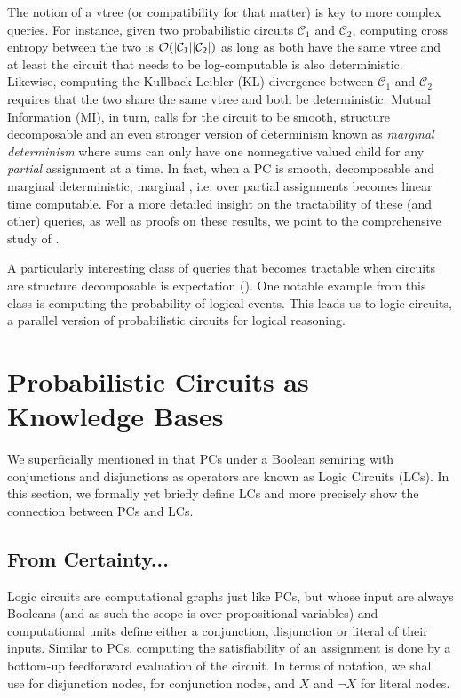 The notion of a vtree (or compatibility for that matter) is key to more complex queries. For
instance, given two probabilistic circuits $\mathcal{C}_1$ and $\mathcal{C}_2$, computing cross
entropy between the two is $\mathcal{O}(|\mathcal{C}_1||\mathcal{C}_2|)$ as long as both have the same
vtree and at least the circuit that needs to be log-computable is also deterministic. Likewise,
computing the Kullback-Leibler (KL) divergence between $\mathcal{C}_1$ and $\mathcal{C}_2$ requires
that the two share the same vtree and both be deterministic. Mutual Information (MI), in turn,
calls for the circuit to be smooth, structure decomposable and an even stronger version of
determinism known as \emph{marginal determinism} where sums can only have one nonnegative valued
child for any \emph{partial} assignment at a time. In fact, when a PC is smooth, decomposable and
marginal deterministic, marginal \map{}, i.e. \map{} over partial assignments becomes linear time
computable. For a more detailed insight on the tractability of these (and other) queries, as well
as proofs on these results, we point to the comprehensive study of \citet{vergari21}.

A particularly interesting class of queries that becomes tractable when circuits are structure
decomposable is expectation (\expc{}). One notable example from this class is computing the
probability of logical events. This leads us to logic circuits, a parallel version of probabilistic
circuits for logical reasoning.

\section{Probabilistic Circuits as Knowledge Bases}

We superficially mentioned in  that PCs under a Boolean semiring with
conjunctions and disjunctions as operators are known as Logic Circuits (LCs). In this section, we
formally yet briefly define LCs and more precisely show the connection between PCs and LCs.

\subsection{From Certainty...}

Logic circuits are computational graphs just like PCs, but whose input are always Booleans (and as
such the scope is over propositional variables) and computational units define either a
conjunction, disjunction or literal of their inputs. Similar to PCs, computing the satisfiability
of an assignment is done by a bottom-up feedforward evaluation of the circuit. In terms of
notation, we shall use \inode{\newOrNode} for disjunction nodes, \inode{\newAndNode} for
conjunction nodes, and $X$ and $\neg X$ for literal nodes.

